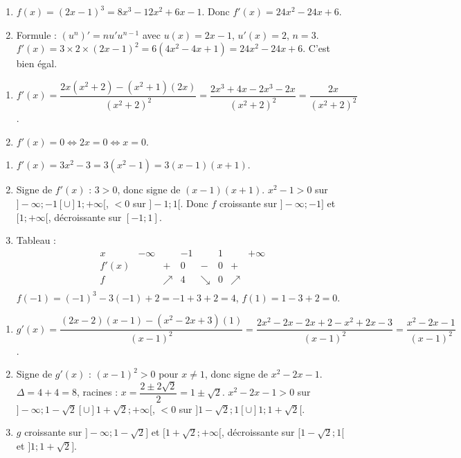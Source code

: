 \begin{enumerate}[label=\alph*)]
\item $f(x)=(2x-1)^3=8x^3-12x^2+6x-1$. Donc $f'(x)=24x^2-24x+6$.
\item Formule : $(u^n)'=nu'u^{n-1}$ avec $u(x)=2x-1$, $u'(x)=2$, $n=3$. $f'(x)=3\times2\times(2x-1)^2=6(4x^2-4x+1)=24x^2-24x+6$. C'est bien égal.
\end{enumerate}

\begin{enumerate}[label=\alph*)]
\item $f'(x)=\dfrac{2x(x^2+2)-(x^2+1)(2x)}{(x^2+2)^2}=\dfrac{2x^3+4x-2x^3-2x}{(x^2+2)^2}=\dfrac{2x}{(x^2+2)^2}$.
\item $f'(x)=0 \iff 2x=0 \iff x=0$.
\end{enumerate}

\begin{enumerate}[label=\alph*)]
\item $f'(x)=3x^2-3=3(x^2-1)=3(x-1)(x+1)$.
\item Signe de $f'(x)$ : $3>0$, donc signe de $(x-1)(x+1)$. $x^2-1>0$ sur $]-\infty;-1[\cup]1;+\infty[$, $<0$ sur $]-1;1[$. Donc $f$ croissante sur $]-\infty;-1]$ et $[1;+\infty[$, décroissante sur $[-1;1]$.
\item Tableau :
\[
\begin{array}{c|ccccccc}
x & -\infty & & -1 & & 1 & & +\infty \\
\hline
f'(x) & & + & 0 & - & 0 & + & \\
\hline
f & & \nearrow & 4 & \searrow & 0 & \nearrow & \\
\end{array}
\]
$f(-1)=(-1)^3-3(-1)+2=-1+3+2=4$, $f(1)=1-3+2=0$.
\end{enumerate}

\begin{enumerate}[label=\alph*)]
\item $g'(x)=\dfrac{(2x-2)(x-1)-(x^2-2x+3)(1)}{(x-1)^2}=\dfrac{2x^2-2x-2x+2-x^2+2x-3}{(x-1)^2}=\dfrac{x^2-2x-1}{(x-1)^2}$.
\item Signe de $g'(x)$ : $(x-1)^2>0$ pour $x\neq1$, donc signe de $x^2-2x-1$. $\Delta=4+4=8$, racines : $x=\dfrac{2\pm2\sqrt2}{2}=1\pm\sqrt2$. $x^2-2x-1>0$ sur $]-\infty;1-\sqrt2[\cup]1+\sqrt2;+\infty[$, $<0$ sur $]1-\sqrt2;1[\cup]1;1+\sqrt2[$.
\item $g$ croissante sur $]-\infty;1-\sqrt2]$ et $[1+\sqrt2;+\infty[$, décroissante sur $[1-\sqrt2;1[$ et $]1;1+\sqrt2]$.
\end{enumerate}


